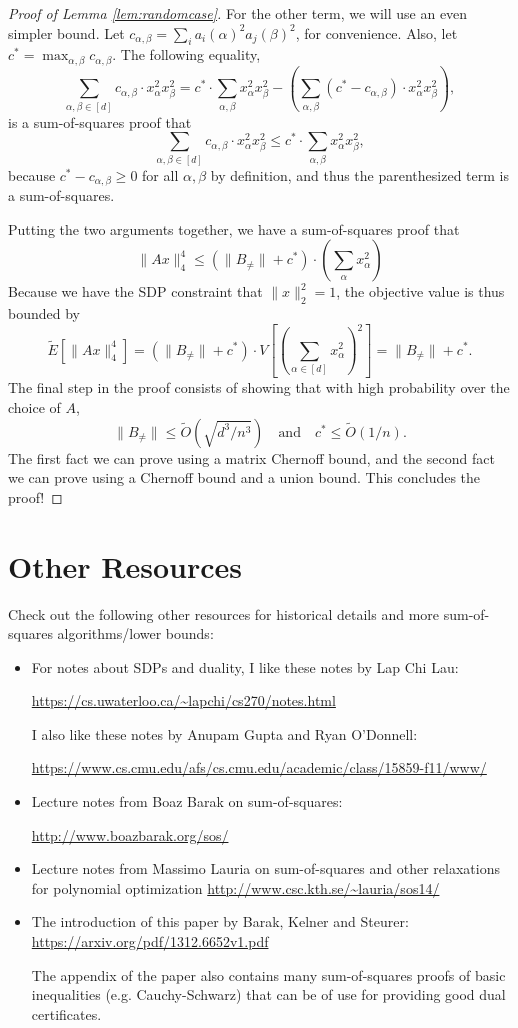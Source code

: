\documentclass[a4paper,11pt]{article}
\theoremstyle{definition}
\begin{document}
\begin{proof}[Proof of Lemma \ref{lem:randomcase}]
For the other term, we will use an even simpler bound.
Let $c_{\alpha,\beta} = \sum_{i} a_i(\alpha)^2 a_j(\beta)^2$, for convenience.
Also, let $c^* = \max_{\alpha,\beta} c_{\alpha,\beta}$.
The following equality,
\[
\sum_{\alpha,\beta\in[d]}c_{\alpha,\beta}\cdot  x_{\alpha}^2 x_{\beta}^2 
= c^*\cdot \sum_{\alpha, \beta} x_{\alpha}^2 x_{\beta}^2 -
\left(\sum_{\alpha,\beta} (c^* - c_{\alpha,\beta}) \cdot x_{\alpha}^2 x_{\beta}^2\right),
\]
is a sum-of-squares proof that
\[
\sum_{\alpha,\beta\in[d]}c_{\alpha,\beta}\cdot  x_{\alpha}^2 x_{\beta}^2 
\le c^*\cdot \sum_{\alpha, \beta} x_{\alpha}^2 x_{\beta}^2,
\]
because $c^* - c_{\alpha,\beta} \ge 0$ for all $\alpha,\beta$ by definition, and thus the parenthesized term is a sum-of-squares.

Putting the two arguments together, we have a sum-of-squares proof that
\[
\|Ax\|_4^4 \le \left(\|B_{\neq}\| + c^*\right)\cdot \left(\sum_{\alpha} x_{\alpha}^2\right)
\]
Because we have the SDP constraint that $\|x\|_2^2 = 1$, the objective value is thus bounded by
\[
\tilde{E}[\|Ax\|_4^4] = (\|B_{\neq} \|+ c^*) \cdot V\left[\left(\sum_{\alpha\in [d]}x_{\alpha}^2\right)^2\right] = \|B_{\neq}\| + c^*.
\]
The final step in the proof consists of showing that with high probability over the choice of $A$, 
\[
\|B_{\neq}\| \le \tilde{O}(\sqrt{d^3/n^3})\quad \text{and}\quad c^* \le \tilde{O}(1/n).
\]
The first fact we can prove using a matrix Chernoff bound, and the second fact we can prove using a Chernoff bound and a union bound.
This concludes the proof!
\end{proof}

\section{Other Resources}
Check out the following other resources for historical details and more sum-of-squares algorithms/lower bounds:
\begin{itemize}
\item For notes about SDPs and duality, I like these notes by Lap Chi Lau:

\url{https://cs.uwaterloo.ca/~lapchi/cs270/notes.html}

I also like these notes by Anupam Gupta and Ryan O'Donnell:

\url{https://www.cs.cmu.edu/afs/cs.cmu.edu/academic/class/15859-f11/www/}
\item Lecture notes from Boaz Barak on sum-of-squares:

\url{http://www.boazbarak.org/sos/}

\item Lecture notes from Massimo Lauria on sum-of-squares and other relaxations for polynomial optimization
\url{http://www.csc.kth.se/~lauria/sos14/}
\item The introduction of this paper by Barak, Kelner and Steurer:
\url{https://arxiv.org/pdf/1312.6652v1.pdf}

The appendix of the paper also contains many sum-of-squares proofs of basic inequalities (e.g. Cauchy-Schwarz) that can be of use for providing good dual certificates.
\end{itemize}
\end{document}
